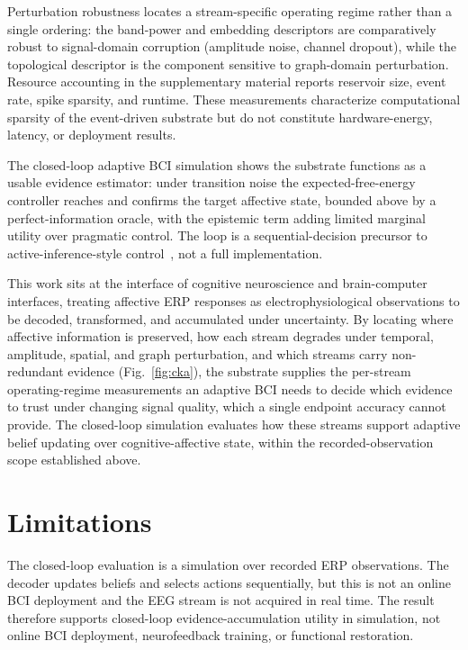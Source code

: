 \documentclass[journal]{IEEEtran}
\begin{document}
Perturbation robustness locates a stream-specific operating regime rather than a single ordering: the band-power and embedding descriptors are comparatively robust to signal-domain corruption (amplitude noise, channel dropout), while the topological descriptor is the component sensitive to graph-domain perturbation. Resource accounting in the supplementary material reports reservoir size, event rate, spike sparsity, and runtime. These measurements characterize computational sparsity of the event-driven substrate but do not constitute hardware-energy, latency, or deployment results.

The closed-loop adaptive BCI simulation shows the substrate functions as a usable evidence estimator: under transition noise the expected-free-energy controller reaches and confirms the target affective state, bounded above by a perfect-information oracle, with the epistemic term adding limited marginal utility over pragmatic control. The loop is a sequential-decision precursor to active-inference-style control~\cite{friston2010free,parr2022activeinference}, not a full implementation.

This work sits at the interface of cognitive neuroscience and brain-computer interfaces, treating affective ERP responses as electrophysiological observations to be decoded, transformed, and accumulated under uncertainty. By locating where affective information is preserved, how each stream degrades under temporal, amplitude, spatial, and graph perturbation, and which streams carry non-redundant evidence (Fig.~\ref{fig:cka}), the substrate supplies the per-stream operating-regime measurements an adaptive BCI needs to decide which evidence to trust under changing signal quality, which a single endpoint accuracy cannot provide. The closed-loop simulation evaluates how these streams support adaptive belief updating over cognitive-affective state, within the recorded-observation scope established above.

\section{Limitations}
The closed-loop evaluation is a simulation over recorded ERP observations. The decoder updates beliefs and selects actions sequentially, but this is not an online BCI deployment and the EEG stream is not acquired in real time. The result therefore supports closed-loop evidence-accumulation utility in simulation, not online BCI deployment, neurofeedback training, or functional restoration.
\end{document}
